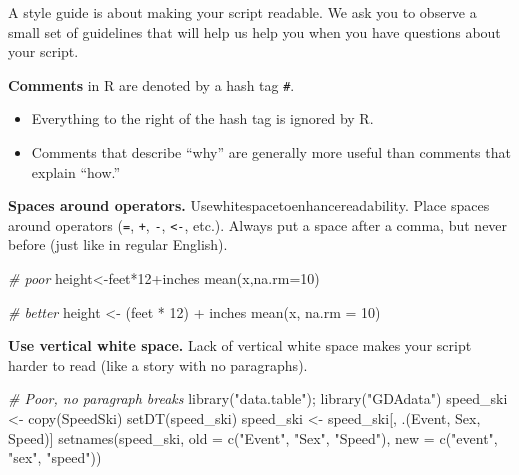 \documentclass[
]{book}
\newenvironment{Shaded}{\begin{snugshade}}{\end{snugshade}}
\newcommand{\AttributeTok}[1]{\textcolor[rgb]{0.77,0.63,0.00}{#1}}
\newcommand{\CommentTok}[1]{\textcolor[rgb]{0.56,0.35,0.01}{\textit{#1}}}
\newcommand{\DecValTok}[1]{\textcolor[rgb]{0.00,0.00,0.81}{#1}}
\newcommand{\FunctionTok}[1]{\textcolor[rgb]{0.00,0.00,0.00}{#1}}
\newcommand{\NormalTok}[1]{#1}
\newcommand{\OtherTok}[1]{\textcolor[rgb]{0.56,0.35,0.01}{#1}}
\newcommand{\SpecialCharTok}[1]{\textcolor[rgb]{0.00,0.00,0.00}{#1}}
\newcommand{\StringTok}[1]{\textcolor[rgb]{0.31,0.60,0.02}{#1}}
\providecommand{\tightlist}{%
  \setlength{\itemsep}{0pt}\setlength{\parskip}{0pt}}
\begin{document}
A style guide is about making your script readable. We ask you to observe a small set of guidelines that will help us help you when you have questions about your script.

\textbf{Comments} in R are denoted by a hash tag \texttt{\#}.

\begin{itemize}
\tightlist
\item
  Everything to the right of the hash tag is ignored by R.
\item
  Comments that describe ``why'' are generally more useful than comments that explain ``how.''
\end{itemize}

\textbf{Spaces around operators.} Usewhitespacetoenhancereadability. Place spaces around operators (\texttt{=}, \texttt{+}, \texttt{-}, \texttt{\textless{}-}, etc.). Always put a space after a comma, but never before (just like in regular English).

\begin{Shaded}
\begin{Highlighting}[]
\CommentTok{\# poor}
\NormalTok{height}\OtherTok{\textless{}{-}}\NormalTok{feet}\SpecialCharTok{*}\DecValTok{12}\SpecialCharTok{+}\NormalTok{inches}
\FunctionTok{mean}\NormalTok{(x,}\AttributeTok{na.rm=}\DecValTok{10}\NormalTok{)}

\CommentTok{\# better}
\NormalTok{height }\OtherTok{\textless{}{-}}\NormalTok{ (feet }\SpecialCharTok{*} \DecValTok{12}\NormalTok{) }\SpecialCharTok{+}\NormalTok{ inches}
\FunctionTok{mean}\NormalTok{(x, }\AttributeTok{na.rm =} \DecValTok{10}\NormalTok{)}
\end{Highlighting}
\end{Shaded}

\textbf{Use vertical white space.} Lack of vertical white space makes your script harder to read (like a story with no paragraphs).

\begin{Shaded}
\begin{Highlighting}[]
\CommentTok{\# Poor, no paragraph breaks}
\FunctionTok{library}\NormalTok{(}\StringTok{"data.table"}\NormalTok{); }\FunctionTok{library}\NormalTok{(}\StringTok{"GDAdata"}\NormalTok{)}
\NormalTok{speed\_ski }\OtherTok{\textless{}{-}} \FunctionTok{copy}\NormalTok{(SpeedSki)}
\FunctionTok{setDT}\NormalTok{(speed\_ski)}
\NormalTok{speed\_ski }\OtherTok{\textless{}{-}}\NormalTok{ speed\_ski[, .(Event, Sex, Speed)]}
\FunctionTok{setnames}\NormalTok{(speed\_ski, }\AttributeTok{old =} \FunctionTok{c}\NormalTok{(}\StringTok{"Event"}\NormalTok{, }\StringTok{"Sex"}\NormalTok{, }\StringTok{"Speed"}\NormalTok{), }\AttributeTok{new =} \FunctionTok{c}\NormalTok{(}\StringTok{"event"}\NormalTok{, }\StringTok{"sex"}\NormalTok{, }\StringTok{"speed"}\NormalTok{))}
\end{Highlighting}
\end{Shaded}
\end{document}
